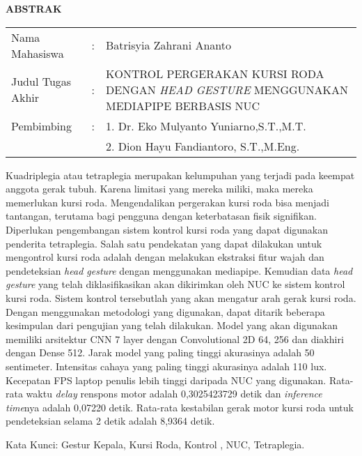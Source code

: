 \begin{center}
  \large\textbf{ABSTRAK}
\end{center}


\vspace{2ex}

\begingroup
\setlength{\tabcolsep}{0pt}

\noindent
\begin{tabularx}{\textwidth}{l >{\centering}m{2em} X}
  Nama Mahasiswa    & : & Batrisyia Zahrani Ananto        \\

  Judul Tugas Akhir & : &     KONTROL PERGERAKAN KURSI RODA DENGAN \emph{HEAD GESTURE} MENGGUNAKAN MEDIAPIPE BERBASIS NUC      \\

  Pembimbing        & : & 1. Dr. Eko Mulyanto Yuniarno,S.T.,M.T.   \\
                    &   & 2. Dion Hayu Fandiantoro, S.T.,M.Eng. \\
\end{tabularx}
\endgroup

Kuadriplegia atau tetraplegia merupakan kelumpuhan yang terjadi pada keempat anggota gerak tubuh. Karena limitasi yang mereka miliki, maka mereka memerlukan kursi roda. Mengendalikan pergerakan kursi roda bisa menjadi tantangan, terutama bagi pengguna dengan keterbatasan fisik signifikan. Diperlukan pengembangan sistem kontrol kursi roda yang dapat digunakan penderita tetraplegia. Salah satu pendekatan yang dapat dilakukan untuk mengontrol kursi roda adalah dengan melakukan ekstraksi fitur wajah dan pendeteksian \emph{head gesture} dengan menggunakan mediapipe. Kemudian data \emph{head gesture} yang telah diklasifikasikan akan dikirimkan oleh NUC ke sistem kontrol kursi roda. Sistem kontrol tersebutlah yang akan mengatur arah gerak kursi roda. Dengan menggunakan metodologi yang digunakan, dapat ditarik beberapa kesimpulan dari pengujian yang telah dilakukan. Model yang akan digunakan memiliki arsitektur CNN 7 layer dengan Convolutional 2D 64, 256 dan diakhiri dengan Dense 512. Jarak model yang paling tinggi akurasinya adalah 50 sentimeter. Intensitas cahaya yang paling tinggi akurasinya adalah 110 lux. Kecepatan FPS laptop penulis lebih tinggi daripada NUC yang digunakan. Rata-rata waktu \emph{delay} renspons motor adalah 0,3025423729 detik dan \emph{inference time}nya adalah 0,07220 detik. Rata-rata kestabilan gerak motor kursi roda untuk pendeteksian selama 2 detik adalah 8,9364 detik.

Kata Kunci: Gestur Kepala, Kursi Roda, Kontrol , NUC, Tetraplegia.

